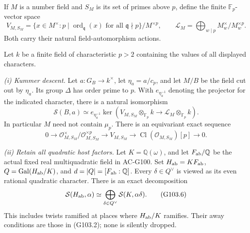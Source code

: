 If $M$ is a number field and $S_M$ is its set of primes above $p$,
define the finite $\mathbb F_p$-vector space
\[
 V_{M,S_M}=\{x\in M^\times:
             p\mid\operatorname{ord}_{\mathfrak q}(x)
                 \text{ for all }\mathfrak q\nmid p\}/M^{\times p},
 \qquad
 \mathcal L_M=\bigoplus_{w\mid p}M_w^\times/M_w^{\times p}.
 \tag{G103.3}
\]
Both carry their natural field-automorphism actions.

\begin{theorem}
\label{thm:ACG103kummer}
Let $k$ be a finite field of characteristic $p>2$ containing the
values of all displayed characters.

\emph{(i) Kummer descent.}
Let $a:G_B\to k^\times$, let $\eta_a=a/c_p$, and let
$M/B$ be the field cut out by $\eta_a$.
Its group $\Delta$ has order prime to $p$.
With $e_{\eta_a^{-1}}$ denoting the projector for the indicated
character, there is a natural isomorphism
\[
 \mathcal S(B,a)\simeq
 e_{\eta_a^{-1}}\ker\left(
 V_{M,S_M}\otimes_{\mathbb F_p}k
       \longrightarrow\mathcal L_M\otimes_{\mathbb F_p}k\right).
 \tag{G103.4}
\]
In particular $M$ need not contain $\mu_p$.
There is an equivariant exact sequence
\[
 0\longrightarrow
 \mathcal O_{M,S_M}^\times/\mathcal O_{M,S_M}^{\times p}
 \longrightarrow V_{M,S_M}
 \longrightarrow\operatorname{Cl}(\mathcal O_{M,S_M})[p]
 \longrightarrow0.
 \tag{G103.5}
\]

\emph{(ii) Retain all quadratic host factors.}
Let $K=\mathbb Q(\omega)$, and let $F_{\rm ab}/\mathbb Q$ be
the actual fixed real multiquadratic field in AC-G100.
Set $H_{\rm ab}=KF_{\rm ab}$, $Q=\operatorname{Gal}(H_{\rm ab}/K)$,
and $d=|Q|=[F_{\rm ab}:\mathbb Q]$.
Every $\delta\in Q^\vee$ is viewed as its even rational quadratic
character.  There is an exact decomposition
\[
 \mathcal S(H_{\rm ab},\alpha)
       \simeq\bigoplus_{\delta\in Q^\vee}
                    \mathcal S(K,\alpha\delta).
 \tag{G103.6}
\]
This includes twists ramified at places where $H_{\rm ab}/K$
ramifies.  Their away conditions are those in (G103.2); none is
silently dropped.


\end{theorem}

